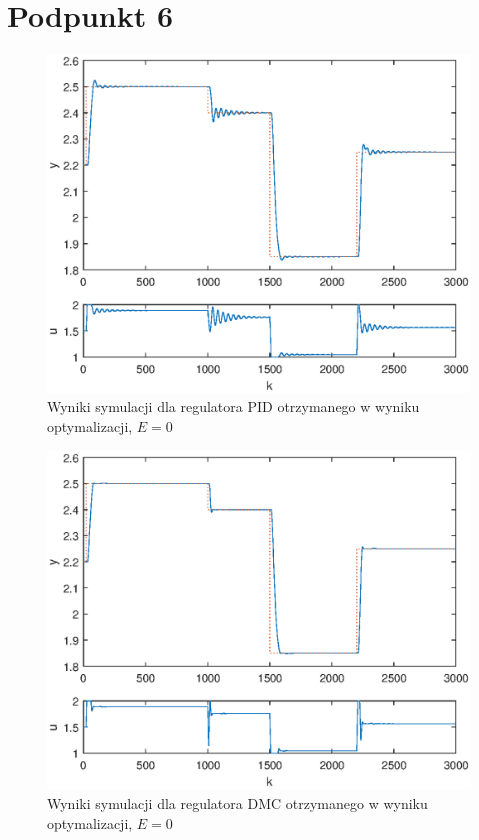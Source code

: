\chapter{Podpunkt 6}


\begin{figure}[ht]
\centering
\includegraphics[scale=1]{images/Z6optimizedPID}
\caption{Wyniki symulacji dla regulatora PID otrzymanego w wyniku optymalizacji, $E=\num{0}$}
\label{Z6optimizedPID}
\end{figure}


\begin{figure}[ht]
\centering
\includegraphics[scale=1]{images/Z6optimizedDMC}
\caption{Wyniki symulacji dla regulatora DMC otrzymanego w wyniku optymalizacji, $E=\num{0}$}
\label{Z6optimizedDMC}
\end{figure}
